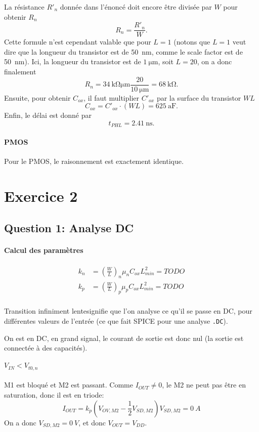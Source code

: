 \documentclass[frenchb,DIV=14]{scrartcl}
\begin{document}
La résistance $R'_n$ donnée dans l'énoncé doit encore être divisée par $W$ pour
obtenir $R_n$
\[ R_n = \frac{R'_n}{W}. \]
Cette formule n'est cependant valable que pour $L=1$ (notons que $L=1$ veut
dire que la longueur du transistor est de \SI{50}{\nano\meter}, comme le
scale factor est de \SI{50}{\nano\meter}). Ici, la longueur du transistor
est de $\SI{1}{\micro\meter}$, soit $L=20$, on a donc finalement
\[ R_n = \SI{34}{\kilo\ohm\micro\meter}\frac{20}{\SI{10}{\micro\meter}} =
\SI{68}{\kilo\ohm}. \]
Ensuite, pour obtenir $C_{ox}$, il faut multiplier $C'_{ox}$ par la surface du
transistor $WL$
\[ C_{ox} = C'_{ox}\cdot(WL) = \SI{625}{\atto\farad}. \]
Enfin, le délai est donné par
\[ t_{PHL} = \SI{2.41}{\nano\second}. \]

\paragraph{PMOS}
Pour le PMOS, le raisonnement est exactement identique.

\section*{Exercice 2}

\subsection*{Question 1: Analyse DC}

\paragraph{Calcul des paramètres}
\begin{align*}
    k_n &= \left(\frac{W}{L}\right)_n \mu_n C_{ox} L_{min}^2 = TODO \\
    k_p &= \left(\frac{W}{L}\right)_p \mu_p C_{ox} L_{min}^2 = TODO \\
\end{align*}

\og Transition infiniment lente\fg signifie que l'on analyse ce qu'il se passe
en DC, pour différentes valeurs de l'entrée (ce que fait SPICE pour une analyse
\texttt{.DC}).

On est en DC, en grand signal, le courant de sortie est donc nul (la sortie est
connectée à des capacités).

\paragraph{$V_{IN} < V_{t0,n}$}
M1 est bloqué et M2 est passant.
Comme $I_{OUT} \neq 0$, le M2 ne peut pas être en saturation,
donc il est en triode:
\[I_{OUT} = k_p \left(V_{OV,M2} - \frac{1}{2} V_{SD,M2}\right)V_{SD,M2} = \SI{0}{A}\]
On a donc $V_{SD,M2} = \SI{0}{V}$, et donc $V_{OUT} = V_{DD}$.
\end{document}
